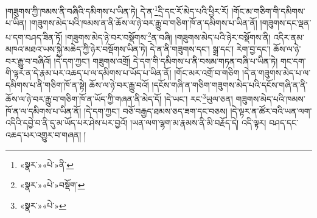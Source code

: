 །གཟུགས་ཀྱི་ཁམས་ནི་བཞིའི་དམིགས་པ་ཡིན་ཏེ། དེ་ན་\footnote{«སྣར་»«པེ་»ནི་}དྲི་དང་རོ་མེད་པའི་ཕྱིར་རོ། །གོང་མ་གཅིག་གི་དམིགས་པ་ཡིན། །གཟུགས་མེད་པའི་ཁམས་ན་ནི་ཆོས་ལ་ཉེ་བར་རྒྱུ་བ་གཅིག་ཁོ་ན་དམིགས་པ་ཡིན་ནོ། །གཟུགས་དང་ལྡན་པ་དག་བཤད་ཟིན་ཏོ། །གཟུགས་མེད་ཉེ་བར་བསྡོགས་\footnote{«སྣར་»«པེ་»བསྡོག་}ན་བཞི། །གཟུགས་མེད་པའི་ཉེར་བསྡོགས་ནི། འདིར་ནམ་མཁའ་མཐའ་ཡས་སྐྱེ་མཆེད་ཀྱི་ཉེར་བསྡོགས་ཡིན་ཏེ། དེ་ན་ནི་གཟུགས་དང་། སྒྲ་དང་། རེག་བྱ་དང་། ཆོས་ལ་ཉེ་བར་རྒྱུ་བ་བཞིའོ། །དེ་དག་ཀྱང་། གཟུགས་འགྲོ། དེ་དག་གི་དམིགས་པ་ནི་བསམ་གཏན་བཞི་པ་ཡིན་ཏེ། གང་དག་གི་ལྟར་ན་དེ་རྣམ་པར་འཆད་པ་ལ་དམིགས་པ་ཡོད་པ་ཡིན་ནོ། །གོང་མར་འགྲོ་བ་གཅིག །དེ་ན་གཟུགས་མེད་པ་ལ་དམིགས་པ་ནི་གཅིག་ཁོ་ན་སྟེ། ཆོས་ལ་ཉེ་བར་རྒྱུ་བའོ། །དངོས་གཞི་ན་གཅིག་གཟུགས་མེད་པའི་དངོས་གཞི་ན་ནི་ཆོས་ལ་ཉེ་བར་རྒྱུ་བ་གཅིག་ཁོ་ན་ཡོད་ཀྱི་གཞན་ནི་མེད་དོ། །དེ་ཡང་། རང་\footnote{«སྣར་»«པེ་»}ཡུལ་ཅན། གཟུགས་མེད་པའི་ཁམས་ཁོ་ན་ལ་དམིགས་པ་ཡིན་ནོ། །དེ་དག་ཀྱང་། བཅོ་བརྒྱད་ཐམས་ཅད་ཟག་དང་བཅས། །དེ་ལྟར་ན་ཚོར་བའི་ཡན་ལག་འདིའི་དབྱེ་བ་ནི་དུ་མ་ཡོད་པར་ཤེས་པར་བྱའོ། །ཡན་ལག་ལྷག་མ་རྣམས་ནི་མི་བརྗོད་དེ། འདི་ལྟར། བཤད་དང་འཆད་པར་འགྱུར་བ་གཞན། །
